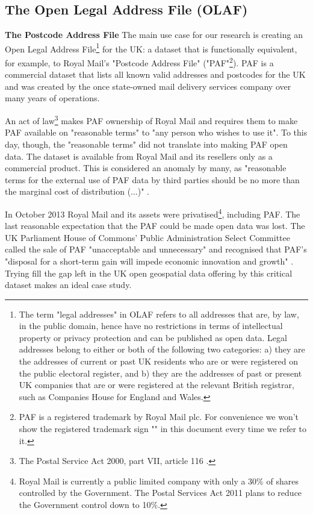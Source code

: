 \subsection{The Open Legal Address File (OLAF)}
\label{subs:the-problem-of-creating-an-olaf}

\textbf{The Postcode Address File} The main use case for our research is creating an Open Legal Address File\footnote{The term "legal addresses" in OLAF refers to all addresses that are, by law, in the public domain, hence have no restrictions in terms of intellectual property or privacy protection and can be published as open data. Legal addresses belong to either or both of the following two categories: a) they are the addresses of current or past UK residents who are or were registered on the public electoral register, and b) they are the addresses of past or present UK companies that are or were registered at the relevant British registrar, such as Companies House for England and Wales.} for the UK: a dataset that is functionally equivalent, for example, to Royal Mail's "Postcode Address File" ("PAF"\footnote{PAF is a registered trademark by Royal Mail plc. For convenience we won't show the registered trademark sign "\textregistered" in this document every time we refer to it.}). PAF is a commercial dataset that lists all known valid addresses and postcodes for the UK and was created by the once state-owned mail delivery services company over many years of operations.

An act of law\footnote{The Postal Service Act 2000, part VII, article 116 \cite{postalserviceact2000}.} makes PAF ownership of Royal Mail and requires them to make PAF available on "reasonable terms" to "any person who wishes to use it". To this day, though, the "reasonable terms" did not translate into making PAF open data. The dataset is available from Royal Mail and its resellers only as a commercial product. This is considered an anomaly by many, as "reasonable terms for the external use of PAF data by third parties should be no more than the marginal cost of distribution (...)" \cite{odugresponse}. 

In October 2013 Royal Mail and its assets were privatised\footnote{Royal Mail is currently a public limited company with only a 30\% of shares controlled by the Government. The Postal Services Act 2011 \cite{postalserviceact2011} plans to reduce the Government control down to 10\%.}, including PAF. The last reasonable expectation that the PAF could be made open data was lost. The UK Parliament House of Commons' Public Administration Select Committee called the sale of PAF "unacceptable and unnecessary" and recognised that PAF's "disposal for a short-term gain will impede economic innovation and growth" \cite{pascod}. Trying fill the gap left in the UK open geospatial data offering by this critical dataset makes an ideal case study. 

